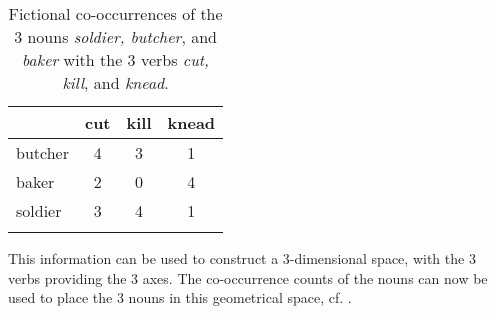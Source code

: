 \begin{table}[!htb]
  \centering
  \begin{tabular}{lccc}\lsptoprule
&cut&kill&knead\\\midrule   
butcher  &4&3&1\\
baker&2&0&4\\
soldier&3&4&1\\\lspbottomrule
  \end{tabular}
  \caption{Fictional co-occurrences of the 3 nouns \emph{soldier, butcher}, and \emph{baker} with the 3 verbs \emph{cut, kill}, and \emph{knead}.}
  \label{tab:soldiers3d}

\end{table}

This information can be used to construct a 3-dimensional space, with
the 3 verbs providing the 3 axes. The co-occurrence counts of the
nouns can now be used to place the 3 nouns in this geometrical space,
cf. .

